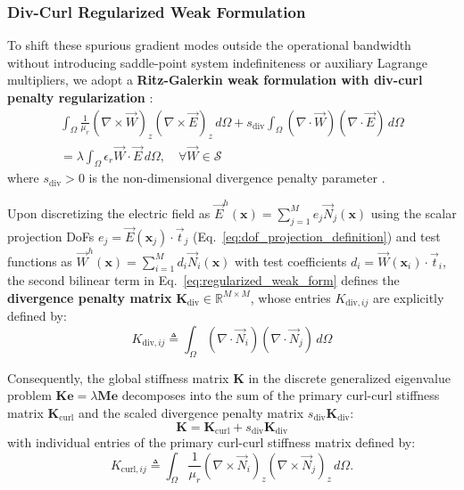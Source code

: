 \documentclass[preprint,12pt]{elsarticle}
\begin{document}
\subsubsection{Div-Curl Regularized Weak Formulation}
\label{subsubsec:div_curl_weak_form}
To shift these spurious gradient modes outside the operational bandwidth without introducing saddle-point system indefiniteness or auxiliary Lagrange multipliers, we adopt a \textbf{Ritz-Galerkin weak formulation with div-curl penalty regularization} \cite{monk2003finite, bossavit1998computational, boffi2013mixed}:
\begin{multline}
    \int_{\Omega} \frac{1}{\mu_r} (\nabla \times \vec{W})_z (\nabla \times \vec{E})_z \, d\Omega + s_{\mathrm{div}} \int_{\Omega} (\nabla \cdot \vec{W}) (\nabla \cdot \vec{E}) \, d\Omega \\
    = \lambda \int_{\Omega} \epsilon_r \vec{W} \cdot \vec{E} \, d\Omega, \quad \forall \vec{W} \in \mathcal{S}
    \label{eq:regularized_weak_form}
\end{multline}
where $s_{\mathrm{div}} > 0$ is the non-dimensional divergence penalty parameter \cite{monk2003finite}.

Upon discretizing the electric field as $\vec{E}^h(\mathbf{x}) = \sum_{j=1}^{M} e_j \vec{N}_j(\mathbf{x})$ using the scalar projection DoFs $e_j = \vec{E}(\mathbf{x}_j) \cdot \vec{t}_j$ (Eq.~\eqref{eq:dof_projection_definition}) and test functions as $\vec{W}^h(\mathbf{x}) = \sum_{i=1}^{M} d_i \vec{N}_i(\mathbf{x})$ with test coefficients $d_i = \vec{W}(\mathbf{x}_i) \cdot \vec{t}_i$, the second bilinear term in Eq.~\eqref{eq:regularized_weak_form} defines the \textbf{divergence penalty matrix} $\mathbf{K}_{\mathrm{div}} \in \mathbb{R}^{M \times M}$, whose entries $K_{\mathrm{div}, ij}$ are explicitly defined by:
\begin{equation}
    K_{\mathrm{div}, ij} \triangleq \int_{\Omega} (\nabla \cdot \vec{N}_i) (\nabla \cdot \vec{N}_j) \, d\Omega
    \label{eq:K_div_definition}
\end{equation}

Consequently, the global stiffness matrix $\mathbf{K}$ in the discrete generalized eigenvalue problem $\mathbf{K} \mathbf{e} = \lambda \mathbf{M} \mathbf{e}$ decomposes into the sum of the primary curl-curl stiffness matrix $\mathbf{K}_{\mathrm{curl}}$ and the scaled divergence penalty matrix $s_{\mathrm{div}} \mathbf{K}_{\mathrm{div}}$:
\begin{equation}
    \mathbf{K} = \mathbf{K}_{\mathrm{curl}} + s_{\mathrm{div}} \mathbf{K}_{\mathrm{div}}
    \label{eq:K_global_decomposition}
\end{equation}
with individual entries of the primary curl-curl stiffness matrix defined by:
\begin{equation}
    K_{\mathrm{curl}, ij} \triangleq \int_{\Omega} \frac{1}{\mu_r} (\nabla \times \vec{N}_i)_z (\nabla \times \vec{N}_j)_z \, d\Omega.
    \label{eq:K_curl_definition}
\end{equation}
\end{document}
